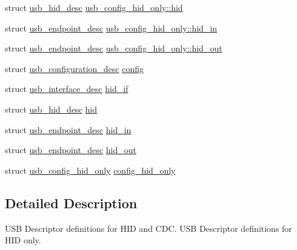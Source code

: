 \begin{DoxyCompactItemize}
\item 
struct \hyperlink{structusb__hid__desc}{usb\-\_\-hid\-\_\-desc} \hyperlink{group___p_i_o_s___u_s_b___d_e_s_c_ga279cdc579474d229bf1bb7963f423423}{usb\-\_\-config\-\_\-hid\-\_\-only\-::hid}
\item 
struct \hyperlink{structusb__endpoint__desc}{usb\-\_\-endpoint\-\_\-desc} \hyperlink{group___p_i_o_s___u_s_b___d_e_s_c_gac0401b402235f315c995eb13de1425ec}{usb\-\_\-config\-\_\-hid\-\_\-only\-::hid\-\_\-in}
\item 
struct \hyperlink{structusb__endpoint__desc}{usb\-\_\-endpoint\-\_\-desc} \hyperlink{group___p_i_o_s___u_s_b___d_e_s_c_ga0bdaf8c80f7739bea621a6d5aa272641}{usb\-\_\-config\-\_\-hid\-\_\-only\-::hid\-\_\-out}
\item 
struct \hyperlink{structusb__configuration__desc}{usb\-\_\-configuration\-\_\-desc} \hyperlink{group___p_i_o_s___u_s_b___d_e_s_c_ga6517677dcb9452a3759e7ec7e360e690}{config}
\item 
struct \hyperlink{structusb__interface__desc}{usb\-\_\-interface\-\_\-desc} \hyperlink{group___p_i_o_s___u_s_b___d_e_s_c_ga66dd41530dc7e219cf377870362857ce}{hid\-\_\-if}
\item 
struct \hyperlink{structusb__hid__desc}{usb\-\_\-hid\-\_\-desc} \hyperlink{group___p_i_o_s___u_s_b___d_e_s_c_ga6eb333cd7c6d156f25fa827aa085579c}{hid}
\item 
struct \hyperlink{structusb__endpoint__desc}{usb\-\_\-endpoint\-\_\-desc} \hyperlink{group___p_i_o_s___u_s_b___d_e_s_c_gad74809997499537622da0aaac4d1c3da}{hid\-\_\-in}
\item 
struct \hyperlink{structusb__endpoint__desc}{usb\-\_\-endpoint\-\_\-desc} \hyperlink{group___p_i_o_s___u_s_b___d_e_s_c_ga0e5a30c27a737b9c3e117e4e8b755b8d}{hid\-\_\-out}
\item 
struct \hyperlink{structusb__config__hid__only}{usb\-\_\-config\-\_\-hid\-\_\-only} \hyperlink{group___p_i_o_s___u_s_b___d_e_s_c_ga4729f56193bb7fb5a7c5115995ec85db}{config\-\_\-hid\-\_\-only}
\end{DoxyCompactItemize}


\subsection{\-Detailed \-Description}
\-U\-S\-B \-Descriptor definitions for \-H\-I\-D and \-C\-D\-C. \-U\-S\-B \-Descriptor definitions for \-H\-I\-D only. 

